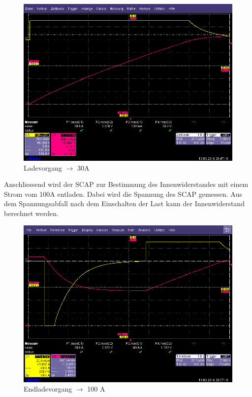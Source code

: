 \documentclass[a4,paper,fleqn]{article}
\begin{document}
\begin{figure}[h!]
    \centering
    \includegraphics[width=1.0\textwidth, trim=0 20 0 45, clip=true]{fig/charge.png}
    \caption{Ladevorgang $\to$ 30\si{\ampere}}
    \label{fig:charge}
\end{figure}

\noindent
Anschliessend wird der SCAP zur Bestimmung des Innenwiderstandes mit einem 
Strom vom 100\si{\ampere} entladen. Dabei wird die Spannung des SCAP gemessen. 
Aus dem Spannungsabfall nach dem Einschalten der Last kann der Innenwiderstand 
berechnet werden. 

\begin{figure}[h!]
    \centering
    \includegraphics[width=1.0\textwidth, trim=0 20 0 45, clip=true]{fig/discharge2.png}
    \caption{Endladevorgang $\to$ 100 \si{\ampere}}
    \label{fig:discharge_i}
\end{figure}
\end{document}
